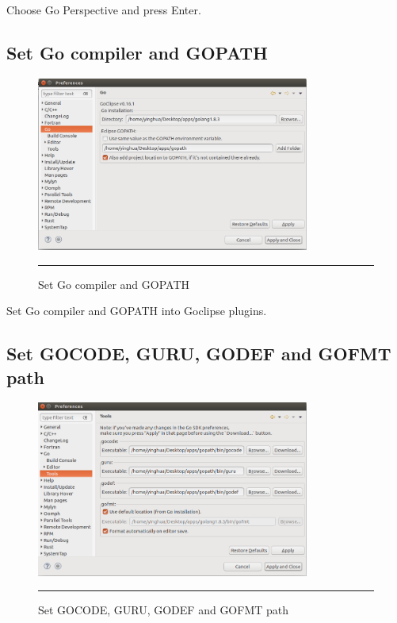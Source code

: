 Choose Go Perspective and press Enter. 

\subsection{Set Go compiler and GOPATH}

\begin{figure}[H]
	\centering
	\includegraphics[width=0.8\textwidth]{Figure/AppendixA/goclipse-installation/5- goclipse-setting.png}
	\rule{35em}{0.5pt}
	\caption[Set Go compiler and GOPATH]{Set Go compiler and GOPATH}
\end{figure}

Set Go compiler  and GOPATH into Goclipse plugins. 

\subsection{Set GOCODE, GURU, GODEF and GOFMT path}

\begin{figure}[H]
	\centering
	\includegraphics[width=0.8\textwidth]{Figure/AppendixA/goclipse-installation/6-goclipse-setting.png}
	\rule{35em}{0.5pt}
	\caption[Set GOCODE, GURU, GODEF and GOFMT path]{Set GOCODE, GURU, GODEF and GOFMT path}
\end{figure}


